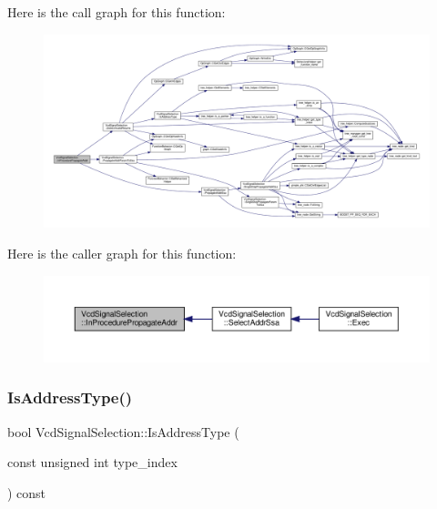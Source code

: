Here is the call graph for this function\+:
\nopagebreak
\begin{figure}[H]
\begin{center}
\leavevmode
\includegraphics[width=350pt]{dd/de4/classVcdSignalSelection_aa804b30439f86e4f9f2de7a57dd206d7_cgraph}
\end{center}
\end{figure}
Here is the caller graph for this function\+:
\nopagebreak
\begin{figure}[H]
\begin{center}
\leavevmode
\includegraphics[width=350pt]{dd/de4/classVcdSignalSelection_aa804b30439f86e4f9f2de7a57dd206d7_icgraph}
\end{center}
\end{figure}
\mbox{\label{classVcdSignalSelection_a0f3b879787fa7afb91ef8a7a9b4b52d1}} 
\subsubsection{\texorpdfstring{Is\+Address\+Type()}{IsAddressType()}}
{\footnotesize\ttfamily bool Vcd\+Signal\+Selection\+::\+Is\+Address\+Type (\begin{DoxyParamCaption}\item[{const unsigned int}]{type\+\_\+index }\end{DoxyParamCaption}) const\hspace{0.3cm}{\ttfamily [protected]}}



